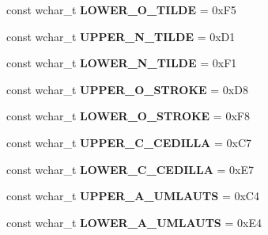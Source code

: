 \begin{DoxyCompactItemize}
\item 
\hypertarget{group___indexing_gabe9f5c39382b2de17275e3a35c749720}{const wchar\-\_\-t {\bfseries L\-O\-W\-E\-R\-\_\-\-O\-\_\-\-T\-I\-L\-D\-E} = 0x\-F5}\label{group___indexing_gabe9f5c39382b2de17275e3a35c749720}

\item 
\hypertarget{group___indexing_gac6633202154cda53971ff9b187c4539b}{const wchar\-\_\-t {\bfseries U\-P\-P\-E\-R\-\_\-\-N\-\_\-\-T\-I\-L\-D\-E} = 0x\-D1}\label{group___indexing_gac6633202154cda53971ff9b187c4539b}

\item 
\hypertarget{group___indexing_ga13c577cad7ab29919dd75858f60900e9}{const wchar\-\_\-t {\bfseries L\-O\-W\-E\-R\-\_\-\-N\-\_\-\-T\-I\-L\-D\-E} = 0x\-F1}\label{group___indexing_ga13c577cad7ab29919dd75858f60900e9}

\item 
\hypertarget{group___indexing_gad7c702f22e93eeffe943e6604d572f77}{const wchar\-\_\-t {\bfseries U\-P\-P\-E\-R\-\_\-\-O\-\_\-\-S\-T\-R\-O\-K\-E} = 0x\-D8}\label{group___indexing_gad7c702f22e93eeffe943e6604d572f77}

\item 
\hypertarget{group___indexing_ga6bf34c6706be81a04231c1d07f567ae8}{const wchar\-\_\-t {\bfseries L\-O\-W\-E\-R\-\_\-\-O\-\_\-\-S\-T\-R\-O\-K\-E} = 0x\-F8}\label{group___indexing_ga6bf34c6706be81a04231c1d07f567ae8}

\item 
\hypertarget{group___indexing_ga32b07f6fc903b562b65db24006581964}{const wchar\-\_\-t {\bfseries U\-P\-P\-E\-R\-\_\-\-C\-\_\-\-C\-E\-D\-I\-L\-L\-A} = 0x\-C7}\label{group___indexing_ga32b07f6fc903b562b65db24006581964}

\item 
\hypertarget{group___indexing_ga2ac89662938b8f68b520cce6701dd3a5}{const wchar\-\_\-t {\bfseries L\-O\-W\-E\-R\-\_\-\-C\-\_\-\-C\-E\-D\-I\-L\-L\-A} = 0x\-E7}\label{group___indexing_ga2ac89662938b8f68b520cce6701dd3a5}

\item 
\hypertarget{group___indexing_gae2305b0b939e2f1110ff83930e75d3a2}{const wchar\-\_\-t {\bfseries U\-P\-P\-E\-R\-\_\-\-A\-\_\-\-U\-M\-L\-A\-U\-T\-S} = 0x\-C4}\label{group___indexing_gae2305b0b939e2f1110ff83930e75d3a2}

\item 
\hypertarget{group___indexing_ga5c5ffc115703cb8d145435f7cfb75097}{const wchar\-\_\-t {\bfseries L\-O\-W\-E\-R\-\_\-\-A\-\_\-\-U\-M\-L\-A\-U\-T\-S} = 0x\-E4}\label{group___indexing_ga5c5ffc115703cb8d145435f7cfb75097}


\end{DoxyCompactItemize}
